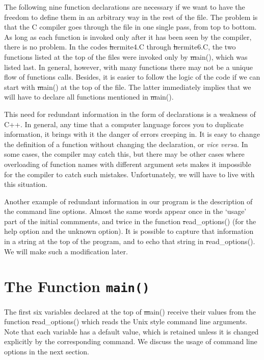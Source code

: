 The following nine function declarations are necessary if we want to
have the freedom to define them in an arbitrary way in the rest of the
file.  The problem is that the C compiler goes through the file in one
single pass, from top to bottom.  As long as each function is invoked
only after it has been seen by the compiler, there is no problem.  In
the codes {\st hermite4.C} through {\st hermite6.C}, the two functions
listed at the top of the files were invoked only by {\st main()},
which was listed last.  In general, however, with many functions there
may not be a unique flow of functions calls.  Besides, it is easier to
follow the logic of the code if we can start with {\st main()} at the
top of the file.  The latter immediately implies that we will have to
declare all functions mentioned in {\st main()}.

This need for redundant information in the form of declarations is a
weakness of C++.  In general, any time that a computer language forces
you to duplicate information, it brings with it the danger of errors
creeping in.  It is easy to change the definition of a function
without changing the declaration, or {\it vice versa.}  In some cases,
the compiler may catch this, but there may be other cases where
overloading of function names with different argument sets makes it
impossible for the compiler to catch such mistakes.  Unfortunately, we
will have to live with this situation.

Another example of redundant information in our program is the
description of the command line options.  Almost the same words appear
once in the `usage' part of the initial commments, and twice in the
function {\st read\_options()} (for the help option and the unknown
option).  It is possible to capture that information in a string at
the top of the program, and to echo that string in {\st read\_options()}.
We will make such a modification later.

\section{The Function {\tt main()}}


The first six variables declared at the top of {\st main()} receive
their values from the function {\st read\_options()} which reads the
Unix style command line arguments.  Note that each variable has a
default value, which is retained unless it is changed explicitly by
the corresponding command.  We discuss the usage of command line
options in the next section.

